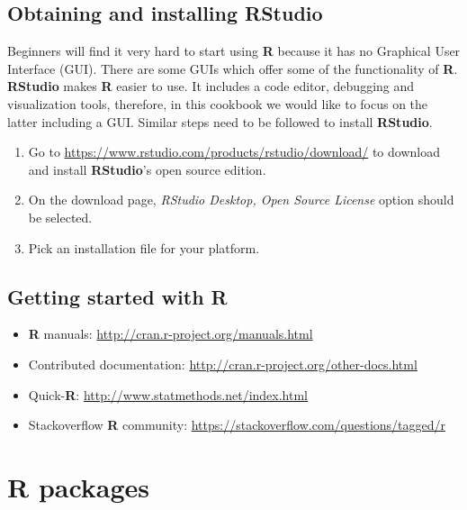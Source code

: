 \documentclass[10pt,b5paper,]{book}
\providecommand{\tightlist}{%
  \setlength{\itemsep}{0pt}\setlength{\parskip}{0pt}}
\theoremstyle{definition}
\theoremstyle{definition}
\theoremstyle{definition}
\theoremstyle{remark}
\begin{document}
\hypertarget{obtaining-and-installing-rstudio}{%
\subsection{Obtaining and installing
RStudio}\label{obtaining-and-installing-rstudio}}

Beginners will find it very hard to start using \textbf{R} because it
has no Graphical User Interface (GUI). There are some GUIs which offer
some of the functionality of \textbf{R}. \textbf{RStudio} makes
\textbf{R} easier to use. It includes a code editor, debugging and
visualization tools, therefore, in this cookbook we would like to focus
on the latter including a GUI. Similar steps need to be followed to
install \textbf{RStudio}.

\begin{enumerate}
\def\labelenumi{\arabic{enumi}.}
\tightlist
\item
  Go to \url{https://www.rstudio.com/products/rstudio/download/} to
  download and install \textbf{RStudio}'s open source edition.
\item
  On the download page, \emph{RStudio Desktop, Open Source License}
  option should be selected.
\item
  Pick an installation file for your platform.
\end{enumerate}

\hypertarget{getting-started-with-r}{%
\subsection{Getting started with R}\label{getting-started-with-r}}

\begin{itemize}
\tightlist
\item
  \textbf{R} manuals: \url{http://cran.r-project.org/manuals.html}
\item
  Contributed documentation:
  \url{http://cran.r-project.org/other-docs.html}
\item
  Quick-\textbf{R}: \url{http://www.statmethods.net/index.html}
\item
  Stackoverflow \textbf{R} community:
  \url{https://stackoverflow.com/questions/tagged/r}
\end{itemize}

\hypertarget{r-packages}{%
\section{R packages}\label{r-packages}}
\end{document}
